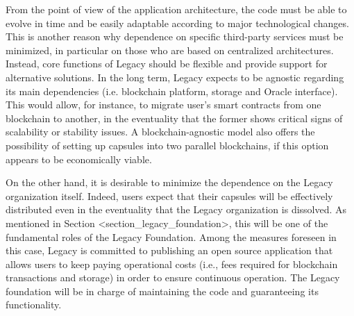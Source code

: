 From the point of view of the application architecture, the code must be able to evolve in time and be easily adaptable according to major technological changes. This is another reason why dependence on specific third-party services must be minimized, in particular on those who are based on centralized architectures. Instead, core functions of Legacy should be flexible and provide support for alternative solutions. In the long term, Legacy expects to be agnostic regarding its main dependencies (i.e. blockchain platform, storage and Oracle interface). This would allow, for instance, to migrate user’s smart contracts from one blockchain to another, in the eventuality that the former shows critical signs of scalability or stability issues. A blockchain-agnostic model also offers the possibility of setting up capsules into two parallel blockchains, if this option appears to be economically viable.    

On the other hand, it is desirable to minimize the dependence on the Legacy organization itself. Indeed, users expect that their capsules will be effectively distributed even in the eventuality that the Legacy organization is dissolved. As mentioned in Section <section_legacy_foundation>, this will be one of the fundamental roles of the Legacy Foundation. Among the measures foreseen in this case, Legacy is committed to publishing an open source application that allows users to keep paying operational costs (i.e., fees required for blockchain transactions and storage) in order to ensure continuous operation. The Legacy foundation will be in charge of maintaining the code and guaranteeing its functionality.


